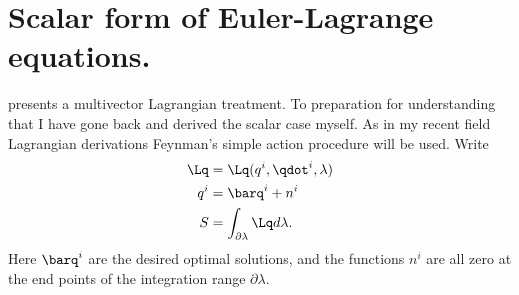 %
%
\section{Scalar form of Euler-Lagrange equations.}
%
\citep{lasenby1993mda} presents a multivector Lagrangian treatment.  To
preparation for understanding that I have gone
back and derived the scalar
case myself.  As in my recent field Lagrangian derivations Feynman's
\citep{feynman1963flp} simple action procedure will be used.
%
Write
%
\begin{equation}\label{eqn:eulerLagrange:22}
\begin{aligned}
\Lq &= \Lq(q^i, \qdot^i, \lambda) \\
q^i &= \barq^i + n^i \\
S &= \int_{\partial \lambda} \Lq d\lambda.
\end{aligned}
\end{equation}
%
Here \(\barq^i\) are the desired optimal solutions, and the functions \(n^i\)
are all zero at the end points of the integration range \(\partial \lambda\).

